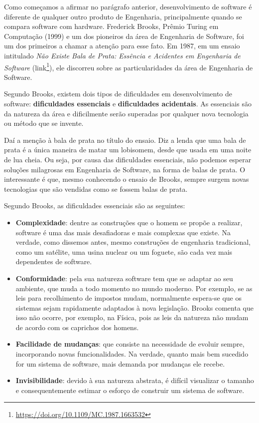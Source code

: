 \documentclass[
  11pt,
  twoside]{book}
\DeclareRobustCommand{\href}[2]{#2\footnote{\url{#1}}}
\begin{document}
 Como começamos a afirmar no parágrafo
anterior, desenvolvimento de software é diferente de qualquer outro
produto de Engenharia, principalmente quando se compara software com
hardware. Frederick Brooks, Prêmio Turing em Computação (1999) e um dos
pioneiros da área de Engenharia de Software, foi um dos primeiros a
chamar a atenção para esse fato. Em 1987, em um ensaio intitulado
\emph{Não Existe Bala de Prata: Essência e Acidentes em Engenharia de
Software} (\href{https://doi.org/10.1109/MC.1987.1663532}{link}), ele
discorreu sobre as particularidades da área de Engenharia de Software.

  Segundo
Brooks, existem dois tipos de dificuldades em desenvolvimento de
software: \textbf{dificuldades essenciais} e \textbf{dificuldades
acidentais}. As essenciais são da natureza da área e dificilmente serão
superadas por qualquer nova tecnologia ou método que se invente.

Daí a menção à bala de prata no título do ensaio. Diz a lenda que uma
bala de prata é a única maneira de matar um lobisomem, desde que usada
em uma noite de lua cheia. Ou seja, por causa das dificuldades
essenciais, não podemos esperar soluções milagrosas em Engenharia de
Software, na forma de balas de prata. O interessante é que, mesmo
conhecendo o ensaio de Brooks, sempre surgem novas tecnologias que são
vendidas como se fossem balas de prata.

Segundo Brooks, as dificuldades essenciais são as seguintes:

\begin{itemize}
\item
  \textbf{Complexidade}: dentre as construções que o homem se propõe a
  realizar, software é uma das mais desafiadoras e mais complexas que
  existe. Na verdade, como dissemos antes, mesmo construções de
  engenharia tradicional, como um satélite, uma usina nuclear ou um
  foguete, são cada vez mais dependentes de software.
\item
  \textbf{Conformidade}: pela sua natureza software tem que se adaptar
  ao seu ambiente, que muda a todo momento no mundo moderno. Por
  exemplo, se as leis para recolhimento de impostos mudam, normalmente
  espera-se que os sistemas sejam rapidamente adaptados à nova
  legislação. Brooks comenta que isso não ocorre, por exemplo, na
  Física, pois as leis da natureza não mudam de acordo com os caprichos
  dos homens.
\item
  \textbf{Facilidade de mudanças}: que consiste na necessidade de
  evoluir sempre, incorporando novas funcionalidades. Na verdade, quanto
  mais bem sucedido for um sistema de software, mais demanda por
  mudanças ele recebe.
\item
  \textbf{Invisibilidade}: devido à sua natureza abstrata, é difícil
  visualizar o tamanho e consequentemente estimar o esforço de construir
  um sistema de software.
\end{itemize}
\end{document}
